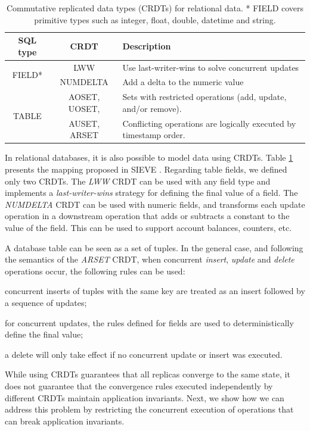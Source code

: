 \documentclass[11pt]{article}
\begin{document}
\begin{table}[t!]
\small
\centering
\begin{tabular}{|c|c|p{9.3cm}|}
\hline
SQL type & CRDT & Description \\
\hline
\hline
\multirow{2}{*}{FIELD*} & LWW &  Use last-writer-wins to solve concurrent updates\\\cline{2-3}
 & NUMDELTA  &  Add a delta to the numeric value \\\hline
\multirow{2}{*}{TABLE} & AOSET,                       UOSET,       & Sets with restricted operations (add, update, and/or remove). \\
& AUSET,              ARSET & Conflicting operations are logically executed by timestamp order.\\
\hline
\end{tabular}
\caption{Commutative replicated data types (CRDTs) for relational data. *
FIELD covers primitive types such as integer, float, double, datetime and string.}
\label{tab:crdts}
\end{table}

In relational databases, it is also possible to model data using CRDTs.
Table \ref{tab:crdts} presents the mapping proposed in SIEVE \cite{Li14Automating}.
Regarding table fields, we defined only two CRDTs. The \emph{LWW} CRDT can be
used with any field type and implements a \emph{last-writer-wins} strategy
for defining the final value of a field.
The \emph{NUMDELTA} CRDT can be used with numeric fields, and transforms each
update operation in a downstream operation that adds or subtracts
a constant to the value of the field.
This can be used to support account balances,
counters, etc.

A database table can be seen as a set of tuples.
In the general case, and following the semantics of the \emph{ARSET} CRDT, when concurrent
\emph{insert}, \emph{update} and \emph{delete} operations occur,
the following rules can be used:
\begin{inparaenum}[(1)]
\item concurrent inserts of tuples with the same key are treated as an insert followed
by a sequence of updates;
\item for concurrent updates, the rules defined for fields
are used to deterministically define the final value;
\item a delete will only take effect if no concurrent update or insert was executed.
\end{inparaenum}

While using CRDTs guarantees that all replicas converge to the same state, it does
not guarantee that the convergence rules executed independently by different CRDTs
maintain application invariants. Next, we show how we can address
this problem by restricting the concurrent execution of operations that can break
application invariants.
\end{document}
